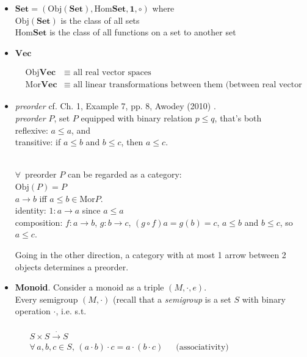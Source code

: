 \begin{itemize}
	\item $\textbf{Set} = (\text{Obj}{(\textbf{Set})}, \text{Hom}{\textbf{Set}},\mathbf{1},\circ)$ where \\
	$\text{Obj}{(\textbf{Set})}$ is the class of all sets \\
	$\text{Hom}{\textbf{Set}}$ is the class of all functions on a set to another set
	\item $\textbf{Vec}$
	
	\[
	\begin{aligned}
	& \text{Obj}\textbf{Vec} & \equiv \text{ all real vector spaces } \\ 
	& \text{Mor}\textbf{Vec} & \equiv \text{ all linear transformations between them (between real vector spaces) }
	\end{aligned}
	\]
	\item \emph{preorder} cf. Ch. 1, Example 7, pp. 8, Awodey (2010) \cite{agat:Awod2010}. \\
	\emph{preorder} $P$, set $P$ equipped with binary relation $p\leq q $, that's both \\
	reflexive: $a\leq a$, and \\
	transitive: if $a \leq b$ and $b \leq c$, then $a\leq c$. 
	
	\quad \\
	$\forall \, $ preorder $P$ can be regarded as a category: \\
	$\text{Obj}(P) = P$ \\
	$a \to b$ iff $a\leq b \in \text{Mor}P$. \\
	identity: $1 :a \to a$ since $a\leq a$ \\
	composition: $f:a\to b$, $g:b\to c$, $(g\circ f)a = g(b) = c$, $a\leq b$ and $b\leq c$, so $a\leq c$. 
	
	Going in the other direction, a category with at most 1 arrow between 2 objects determines a preorder.
	\item \textbf{Monoid}.  Consider a monoid as a triple $(M, \cdot, e)$.  \\
	Every semigroup $(M,\cdot)$ (recall that a \emph{semigroup} is a set $S$ with binary operation $\cdot $, i.e. s.t.
	
	\quad \,  $\begin{aligned} & \quad \\
	& S\times S \xrightarrow{\cdot } S \\ 
	& \forall \, a,b ,c \in S, \, (a\cdot b)\cdot c = a\cdot (b\cdot c) \quad \, \text{ (associativity) } \end{aligned}$ 
	

\end{itemize}
